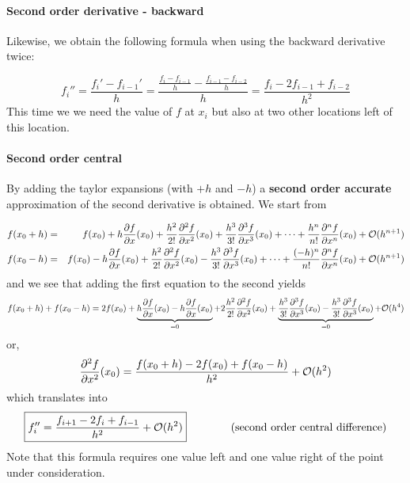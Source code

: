 \paragraph{Second order derivative - backward}
Likewise, we obtain the following formula when using the backward derivative twice:

\begin{equation}
f_{i}'' 
= \frac{f_{i}'-f_{i-1}'}{h} 
= \frac{\frac{f_{i}-f_{i-1}}{h}- \frac{f_{i-1}-f_{i-2}}{h}  }{h} 
= \frac{f_{i}-2f_{i-1}+f_{i-2}}{h^2} 
\end{equation}
This time we  we need the value of $f$ at $x_i$ but also at two 
other locations left of this location.

\paragraph{Second order central} 
By adding the taylor expansions (with $+h$ and $-h$) 
a {\bf second order accurate}  approximation of the second derivative is obtained.
We start from 

\begin{eqnarray}
f(x_0+h)&=&f(x_0)+ 
h \frac{\partial f}{\partial x}(x_0)  + 
\frac{h^2}{2!} \frac{\partial^2 f}{\partial x^2}(x_0)  +
\frac{h^3}{3!} \frac{\partial^3 f}{\partial x^3}(x_0)  +
\dots  +
\frac{h^n}{n!} \frac{\partial^n f}{\partial x^n}(x_0)  
+ {\cal O}(h^{n+1}) 
\nonumber\\
f(x_0-h)&=&f(x_0) 
-h \frac{\partial f}{\partial x}(x_0)  + 
\frac{h^2}{2!} \frac{\partial^2 f}{\partial x^2}(x_0)  -
\frac{h^3}{3!} \frac{\partial^3 f}{\partial x^3}(x_0)  +
\dots  +
\frac{(-h)^n}{n!} \frac{\partial^n f}{\partial x^n}(x_0)  
+ {\cal O}(h^{n+1}) \nonumber
\end{eqnarray}
and we see that adding the first equation to the second yields
\begin{equation}
f(x_0+h) + f(x_0-h) =2 f(x_0)+ 
\underbrace{h \frac{\partial f}{\partial x}(x_0)   
-h \frac{\partial f}{\partial x}(x_0)}_{=0}  + 
2\frac{h^2}{2!} \frac{\partial^2 f}{\partial x^2}(x_0)  
+
\underbrace{
\frac{h^3}{3!} \frac{\partial^3 f}{\partial x^3}(x_0)  
-\frac{h^3}{3!} \frac{\partial^3 f}{\partial x^3}(x_0)  
}_{=0}
+ {\cal O}(h^{4})
\end{equation}
or, 
\begin{equation}
\frac{\partial^2 f}{\partial x^2}(x_0)  =
\frac{f(x_0+h) -2f(x_0) + f(x_0-h) }{h^2}
+ {\cal O}(h^2)
\end{equation}
which translates into
\begin{equation}
\boxed{
f_{i}''=\frac{f_{i+1}-2f_i+f_{i-1}}{h^2} + {\cal O}(h^2)
}
\qquad
\qquad
\text{(second order central difference)}
\label{eq:fpp1}
\end{equation}
Note that this formula requires one value left and one value right of the point 
under consideration. 

